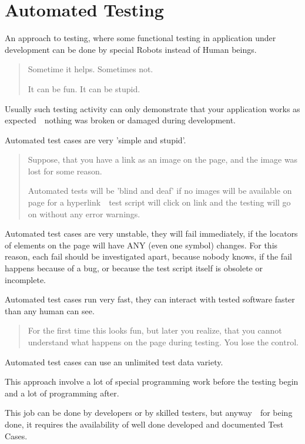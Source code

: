 \section{Automated Testing}
\label{sec:Automated Testing}

An approach to testing, where some functional testing in application under development can be done by special Robots instead of Human beings.

\begin{quote}
Sometime it helps. Sometimes not.

It can be fun. It can be stupid.\end{quote} 

Usually such testing activity can only demonstrate that your application works as expected~\textemdash~nothing was broken or damaged during development.

Automated test cases are very 'simple and stupid'.

\begin{quote}
Suppose, that you have a link as an image on the page, and the image was lost for some reason.

Automated tests will be 'blind and deaf' if no images will be available on page for a hyperlink~\textemdash~test script will click on link and the testing will go on without any error warnings.\end{quote} 

Automated test cases are very unstable, they will fail immediately, if the locators of elements on the page will have ANY (even one symbol) changes. For this reason, each fail should be investigated apart, because nobody knows, if the fail happens because of a bug, or because the test script itself is obsolete or incomplete.

Automated test cases run very fast, they can interact with tested software faster than any human can see.

\begin{quote}
For the first time this looks fun, but later you realize, that you cannot understand what happens on the page during testing. You lose the control.
\end{quote} 

Automated test cases can use an unlimited test data variety.

This approach involve a lot of special programming work before the testing begin and a lot of programming after.

This job can be done by developers or by skilled testers, but anyway~\textemdash~for being done, it requires the availability of well done developed and documented Test Cases.

